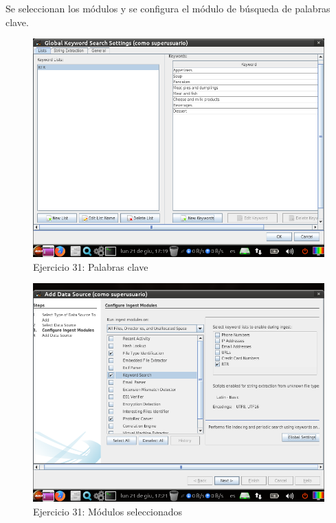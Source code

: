 \documentclass[11pt]{article}
\begin{document}
Se seleccionan los módulos y se configura el módulo de búsqueda de palabras clave.

\begin{figure}[H]
    \caption{Ejercicio 31: Palabras clave}
  \centering
  \includegraphics[scale=0.7]{p02/e31-3.png}
\end{figure}

\begin{figure}[H]
    \caption{Ejercicio 31: Módulos seleccionados}
  \centering
  \includegraphics[scale=0.7]{p02/e31-4.png}
\end{figure}
\end{document}

